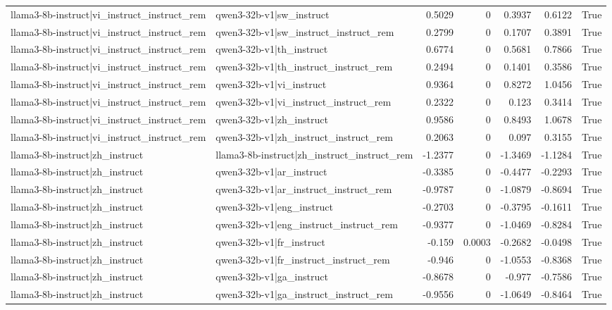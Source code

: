 \begin{table}
\begin{tabular}{l l r r r r l}
llama3-8b-instruct|vi_instruct_instruct_rem & qwen3-32b-v1|sw_instruct & 0.5029 & 0 & 0.3937 & 0.6122 & True \\
llama3-8b-instruct|vi_instruct_instruct_rem & qwen3-32b-v1|sw_instruct_instruct_rem & 0.2799 & 0 & 0.1707 & 0.3891 & True \\
llama3-8b-instruct|vi_instruct_instruct_rem & qwen3-32b-v1|th_instruct & 0.6774 & 0 & 0.5681 & 0.7866 & True \\
llama3-8b-instruct|vi_instruct_instruct_rem & qwen3-32b-v1|th_instruct_instruct_rem & 0.2494 & 0 & 0.1401 & 0.3586 & True \\
llama3-8b-instruct|vi_instruct_instruct_rem & qwen3-32b-v1|vi_instruct & 0.9364 & 0 & 0.8272 & 1.0456 & True \\
llama3-8b-instruct|vi_instruct_instruct_rem & qwen3-32b-v1|vi_instruct_instruct_rem & 0.2322 & 0 & 0.123 & 0.3414 & True \\
llama3-8b-instruct|vi_instruct_instruct_rem & qwen3-32b-v1|zh_instruct & 0.9586 & 0 & 0.8493 & 1.0678 & True \\
llama3-8b-instruct|vi_instruct_instruct_rem & qwen3-32b-v1|zh_instruct_instruct_rem & 0.2063 & 0 & 0.097 & 0.3155 & True \\
llama3-8b-instruct|zh_instruct & llama3-8b-instruct|zh_instruct_instruct_rem & -1.2377 & 0 & -1.3469 & -1.1284 & True \\
llama3-8b-instruct|zh_instruct & qwen3-32b-v1|ar_instruct & -0.3385 & 0 & -0.4477 & -0.2293 & True \\
llama3-8b-instruct|zh_instruct & qwen3-32b-v1|ar_instruct_instruct_rem & -0.9787 & 0 & -1.0879 & -0.8694 & True \\
llama3-8b-instruct|zh_instruct & qwen3-32b-v1|eng_instruct & -0.2703 & 0 & -0.3795 & -0.1611 & True \\
llama3-8b-instruct|zh_instruct & qwen3-32b-v1|eng_instruct_instruct_rem & -0.9377 & 0 & -1.0469 & -0.8284 & True \\
llama3-8b-instruct|zh_instruct & qwen3-32b-v1|fr_instruct & -0.159 & 0.0003 & -0.2682 & -0.0498 & True \\
llama3-8b-instruct|zh_instruct & qwen3-32b-v1|fr_instruct_instruct_rem & -0.946 & 0 & -1.0553 & -0.8368 & True \\
llama3-8b-instruct|zh_instruct & qwen3-32b-v1|ga_instruct & -0.8678 & 0 & -0.977 & -0.7586 & True \\
llama3-8b-instruct|zh_instruct & qwen3-32b-v1|ga_instruct_instruct_rem & -0.9556 & 0 & -1.0649 & -0.8464 & True \\

\end{tabular}
\end{table}
